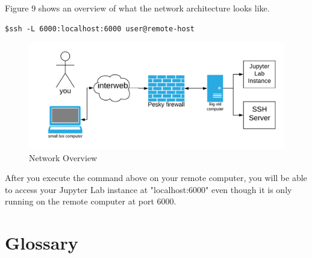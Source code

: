 \documentclass[pdftex,12pt]{artikel3}
\begin{document}
Figure 9 shows an overview of what the network architecture looks like.

\newpage

\begin{lstlisting}[caption=SSH command for local port forwarding]
$ssh -L 6000:localhost:6000 user@remote-host
\end{lstlisting}

\begin{figure}[h!]
    \centering
    \includegraphics[width=15cm]{remoteJupyter.png}
    \caption{Network Overview}
    \label{fig:jupyter_server}
\end{figure}

After you execute the command above on your remote computer, you
will be able to access your Jupyter Lab instance at "localhost:6000" even though it is only running on the remote computer at port 6000.

\newpage

\section{Glossary}
\end{document}
